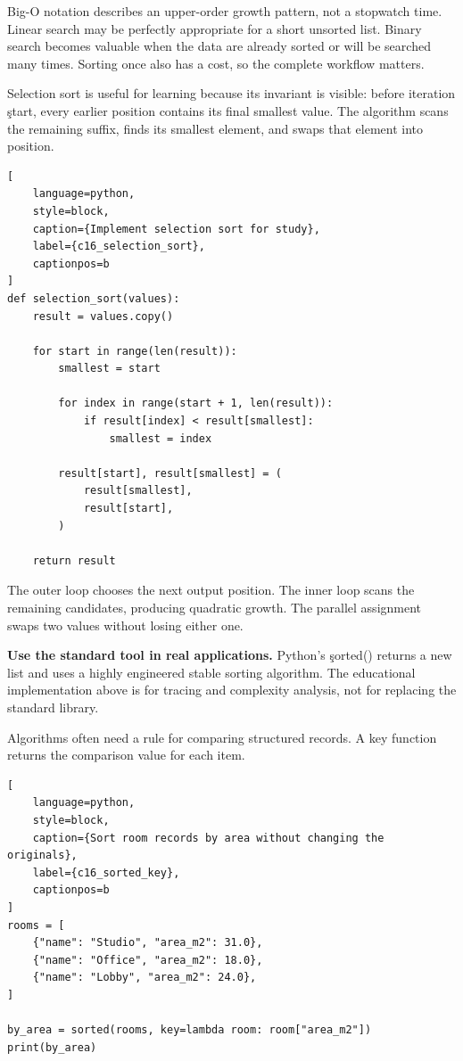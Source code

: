 Big-O notation describes an upper-order growth pattern, not a stopwatch time.
Linear search may be perfectly appropriate for a short unsorted list. Binary
search becomes valuable when the data are already sorted or will be searched
many times. Sorting once also has a cost, so the complete workflow matters.


Selection sort is useful for learning because its invariant is visible: before
iteration \c{start}, every earlier position contains its final smallest value.
The algorithm scans the remaining suffix, finds its smallest element, and swaps
that element into position.

\begin{lstlisting}[
    language=python,
    style=block,
    caption={Implement selection sort for study},
    label={c16_selection_sort},
    captionpos=b
]
def selection_sort(values):
    result = values.copy()

    for start in range(len(result)):
        smallest = start

        for index in range(start + 1, len(result)):
            if result[index] < result[smallest]:
                smallest = index

        result[start], result[smallest] = (
            result[smallest],
            result[start],
        )

    return result
\end{lstlisting}

The outer loop chooses the next output position. The inner loop scans the
remaining candidates, producing quadratic growth. The parallel assignment
swaps two values without losing either one.

\begin{NoteBox}
\textbf{Use the standard tool in real applications.} Python's \c{sorted()}
returns a new list and uses a highly engineered stable sorting algorithm. The
educational implementation above is for tracing and complexity analysis, not
for replacing the standard library.
\end{NoteBox}


Algorithms often need a rule for comparing structured records. A key function
returns the comparison value for each item.

\begin{lstlisting}[
    language=python,
    style=block,
    caption={Sort room records by area without changing the originals},
    label={c16_sorted_key},
    captionpos=b
]
rooms = [
    {"name": "Studio", "area_m2": 31.0},
    {"name": "Office", "area_m2": 18.0},
    {"name": "Lobby", "area_m2": 24.0},
]

by_area = sorted(rooms, key=lambda room: room["area_m2"])
print(by_area)
\end{lstlisting}

